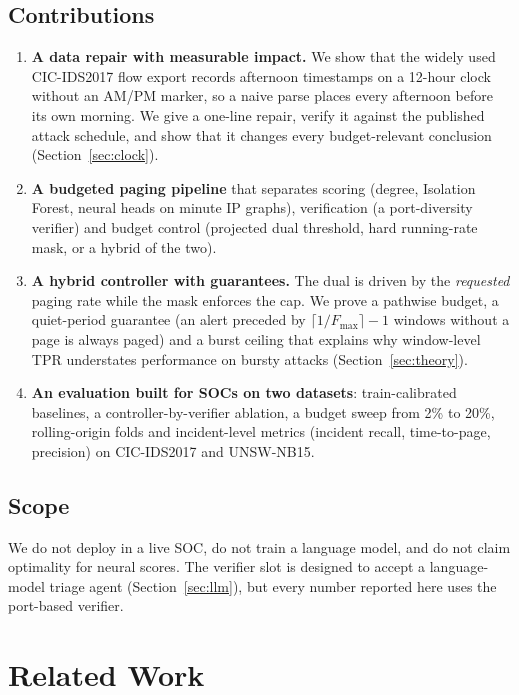 \documentclass[journal,10pt,twocolumn]{IEEEtran}
\newcommand{\Fmax}{F_{\max}}
\begin{document}
\subsection{Contributions}
\begin{enumerate}
\item \textbf{A data repair with measurable impact.} We show that the widely used CIC-IDS2017 flow export records afternoon timestamps on a 12-hour clock without an AM/PM marker, so a naive parse places every afternoon before its own morning. We give a one-line repair, verify it against the published attack schedule, and show that it changes every budget-relevant conclusion (Section~\ref{sec:clock}).
\item \textbf{A budgeted paging pipeline} that separates scoring (degree, Isolation Forest, neural heads on minute IP graphs), verification (a port-diversity verifier) and budget control (projected dual threshold, hard running-rate mask, or a hybrid of the two).
\item \textbf{A hybrid controller with guarantees.} The dual is driven by the \emph{requested} paging rate while the mask enforces the cap. We prove a pathwise budget, a quiet-period guarantee (an alert preceded by $\lceil1/\Fmax\rceil-1$ windows without a page is always paged) and a burst ceiling that explains why window-level TPR understates performance on bursty attacks (Section~\ref{sec:theory}).
\item \textbf{An evaluation built for SOCs on two datasets}: train-calibrated baselines, a controller-by-verifier ablation, a budget sweep from 2\% to 20\%, rolling-origin folds and incident-level metrics (incident recall, time-to-page, precision) on CIC-IDS2017 and UNSW-NB15.
\end{enumerate}

\subsection{Scope}
We do not deploy in a live SOC, do not train a language model, and do not claim optimality for neural scores. The verifier slot is designed to accept a language-model triage agent (Section~\ref{sec:llm}), but every number reported here uses the port-based verifier.

\section{Related Work}
\end{document}
